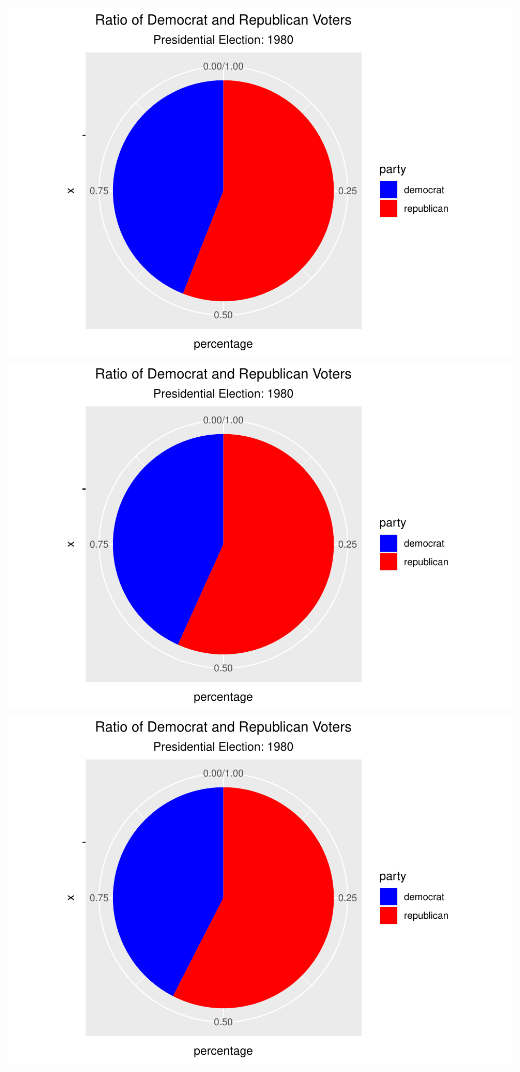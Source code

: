 \documentclass[
]{article}
\begin{document}
\includegraphics{election_files/figure-latex/anim-16.pdf}
\includegraphics{election_files/figure-latex/anim-17.pdf}
\includegraphics{election_files/figure-latex/anim-18.pdf}
\end{document}
